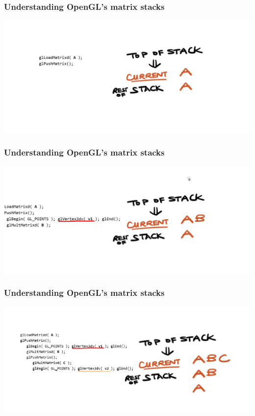 \documentclass{beamer}
\begin{document}
\begin{frame}
    \frametitle{Understanding OpenGL's matrix stacks}

    \begin{center}
        \includegraphics[scale=0.4]{q8-2.png}
    \end{center}

\end{frame}

\begin{frame}
    \frametitle{Understanding OpenGL's matrix stacks}

    \begin{center}
        \includegraphics[scale=0.4]{q8-3.png}
    \end{center}

\end{frame}

\begin{frame}
    \frametitle{Understanding OpenGL's matrix stacks}

    \begin{center}
        \includegraphics[scale=0.4]{q8-4.png}
    \end{center}

\end{frame}
\end{document}
